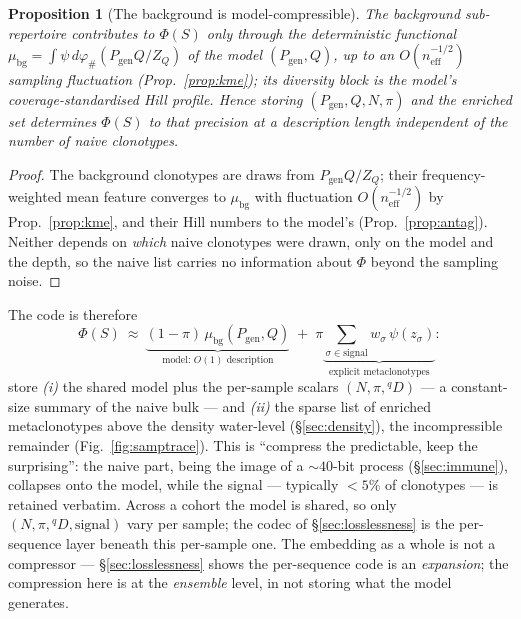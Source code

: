 \documentclass[11pt]{article}
\theoremstyle{oldplain}
\newtheorem{proposition}{Proposition}
\theoremstyle{oldrem}
\newcommand{\Pgen}{P_{\mathrm{gen}}}
\begin{document}
\begin{proposition}[The background is model-compressible]\label{prop:compress}
The background sub-repertoire contributes to $\Phi(S)$ only through the deterministic functional
$\mu_{\mathrm{bg}}=\int\psi\,d\varphi_{\#}(\Pgen Q/Z_Q)$ of the model $(\Pgen,Q)$, up to an
$O(n_{\mathrm{eff}}^{-1/2})$ sampling fluctuation (Prop.~\ref{prop:kme}); its diversity block is the model's
coverage-standardised Hill profile. Hence storing $(\Pgen,Q,N,\pi)$ and the enriched set determines $\Phi(S)$
to that precision at a description length \emph{independent of the number of naive clonotypes}.
\end{proposition}
\begin{proof}
The background clonotypes are draws from $\Pgen Q/Z_Q$; their frequency-weighted mean feature converges to
$\mu_{\mathrm{bg}}$ with fluctuation $O(n_{\mathrm{eff}}^{-1/2})$ by Prop.~\ref{prop:kme}, and their Hill
numbers to the model's (Prop.~\ref{prop:antag}). Neither depends on \emph{which} naive clonotypes were drawn,
only on the model and the depth, so the naive list carries no information about $\Phi$ beyond the sampling
noise. \end{proof}

The code is therefore
\begin{equation}\label{eq:twopart}
  \Phi(S)\ \approx\ \underbrace{(1-\pi)\,\mu_{\mathrm{bg}}(\Pgen,Q)}_{\text{model: }O(1)\text{ description}}
  \;+\;\pi\!\!\underbrace{\sum_{\sigma\in\mathrm{signal}}\!\!w_\sigma\,\psi(z_\sigma)}_{\text{explicit metaclonotypes}} :
\end{equation}
store \emph{(i)} the shared model plus the per-sample scalars $(N,\pi,{}^qD)$ --- a constant-size summary of the
naive bulk --- and \emph{(ii)} the sparse list of enriched metaclonotypes above the density water-level
(\S\ref{sec:density}), the incompressible remainder (Fig.~\ref{fig:samptrace}). This is ``compress the
predictable, keep the surprising'': the naive part, being the image of a ${\sim}40$-bit process
(\S\ref{sec:immune}), collapses onto the model, while the signal --- typically $<5\%$ of clonotypes --- is
retained verbatim. Across a cohort the model is shared, so only $(N,\pi,{}^qD,\text{signal})$ vary per sample;
the codec of \S\ref{sec:losslessness} is the per-sequence layer beneath this per-sample one. The embedding as a
whole is not a compressor --- \S\ref{sec:losslessness} shows the per-sequence code is an \emph{expansion}; the
compression here is at the \emph{ensemble} level, in not storing what the model generates.
\end{document}
